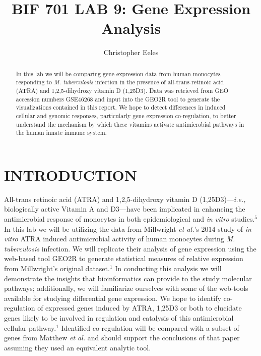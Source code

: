 \documentclass[letterpaper, 10 pt, conference]{ieeeconf}  %
\title{\LARGE \bf
BIF 701 LAB 9: Gene Expression Analysis
}
\author{Christopher Eeles%
}
\begin{document}
\maketitle
\thispagestyle{empty}
\pagestyle{empty}

\begin{abstract}

In this lab we will be comparing gene expression data from human monocytes responding to \textit{M. tuberculosis} infection in the presence of all-trans-retinoic acid (ATRA) and 1,2,5-dihydroxy vitamin D (1,25D3). 
Data was retrieved from GEO accession numbers GSE46268 and input into the GEO2R tool to generate the visualizations contained in this report. We hope to detect differences in induced cellular and genomic responses, 
particularly gene expression co-regulation, to better understand the mechanism by which these vitamins activate antimicrobial pathways in the human innate immune system.

\end{abstract}

\section{INTRODUCTION}

All-trans retinoic acid (ATRA) and 1,2,5-dihydroxy vitamin D (1,25D3)---\textit{i.e.,} biologically active Vitamin A and D3---have been implicated in enhancing the antimicrobial response of monocytes in both epidemiological 
and \textit{in vitro} studies.$^5$ In this lab we will be utilizing the data from Millwright \textit{et al.}'s 2014 study of \textit{in vitro} ATRA induced antimicrobial activity of human monocytes during \textit{M. tuberculosis} 
infection. We will replicate their analysis of gene expression using the web-based tool GEO2R to generate statistical measures of relative expression from Millwright's original dataset.$^1$ In conducting this analysis we will 
demonstrate the insights that bioinformatics can provide to the study molecular pathways; additionally, we will familiarize ourselves with some of the web-tools available for studying differential gene expression. We hope to 
identify co-regulation of expressed genes induced by ATRA, 1,25D3 or both to elucidate genes likely to be involved in regulation and catalysis of this antimicrobial cellular pathway.$^1$ Identified co-regulation will be compared 
with a subset of genes from Matthew \textit{et al.} and should support the conclusions of that paper assuming they used an equivalent analytic tool.
\end{document}
